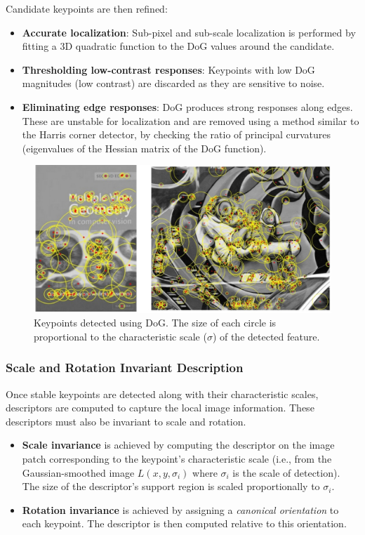 Candidate keypoints are then refined:
\begin{itemize}
    \item \textbf{Accurate localization}: Sub-pixel and sub-scale localization is performed by fitting a 3D quadratic function to the DoG values around the candidate.
    \item \textbf{Thresholding low-contrast responses}: Keypoints with low DoG magnitudes (low contrast) are discarded as they are sensitive to noise.
    \item \textbf{Eliminating edge responses}: DoG produces strong responses along edges. These are unstable for localization and are removed using a method similar to the Harris corner detector, by checking the ratio of principal curvatures (eigenvalues of the Hessian matrix of the DoG function).
\end{itemize}

\begin{figure}[htbp]
  \centering
  \includegraphics[width=0.7\linewidth]{./img/dog_keypoints.jpg}
  \caption{Keypoints detected using DoG. The size of each circle is proportional to the characteristic scale ($\sigma$) of the detected feature.}
  \label{fig:dog_keypoints}
\end{figure}

\subsubsection{Scale and Rotation Invariant Description}
Once stable keypoints are detected along with their characteristic scales, descriptors are computed to capture the local image information. These descriptors must also be invariant to scale and rotation.

\begin{itemize}
  \item \textbf{Scale invariance} is achieved by computing the descriptor on the image patch corresponding to the keypoint's characteristic scale (i.e., from the Gaussian-smoothed image $L(x,y,\sigma_i)$ where $\sigma_i$ is the scale of detection). The size of the descriptor's support region is scaled proportionally to $\sigma_i$.
  \item \textbf{Rotation invariance} is achieved by assigning a \textit{canonical orientation} to each keypoint. The descriptor is then computed relative to this orientation.
\end{itemize}

